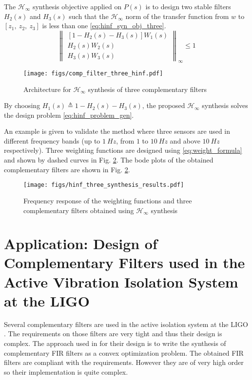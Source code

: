 \documentclass[letterpaper, 10 pt, conference]{ieeeconf}
\begin{document}
The \(\mathcal{H}_\infty\) synthesis objective applied on \(P(s)\) is to design two stable filters \(H_2(s)\) and \(H_3(s)\) such that the \(\mathcal{H}_\infty\) norm of the transfer function from \(w\) to \([z_1,\ z_2, \ z_3]\) is less than one \eqref{eq:hinf_syn_obj_three}.
\begin{equation}
\label{eq:hinf_syn_obj_three}
  \left\| \begin{matrix} \left[1 - H_2(s) - H_3(s)\right] W_1(s) \\ H_2(s) W_2(s) \\ H_3(s) W_3(s) \end{matrix} \right\|_\infty \le 1
\end{equation}

\begin{figure}[htbp]
\centering
\texttt{[image: figs/comp\_filter\_three\_hinf.pdf]}
\caption{\label{fig:comp_filter_three_hinf}
Architecture for \(\mathcal{H}_\infty\) synthesis of three complementary filters}
\end{figure}

By choosing \(H_1(s) \triangleq 1 - H_2(s) - H_3(s)\), the proposed \(\mathcal{H}_\infty\) synthesis solves the design problem \eqref{eq:hinf_problem_gen}. \par
An example is given to validate the method where three sensors are used in different frequency bands (up to \(\SI{1}{Hz}\), from \(1\) to \(\SI{10}{Hz}\) and above \(\SI{10}{Hz}\) respectively).
Three weighting functions are designed using \eqref{eq:weight_formula} and shown by dashed curves in Fig. \ref{fig:hinf_three_synthesis_results}.
The bode plots of the obtained complementary filters are shown in Fig. \ref{fig:hinf_three_synthesis_results}.

\begin{figure}[htbp]
\centering
\texttt{[image: figs/hinf\_three\_synthesis\_results.pdf]}
\caption{\label{fig:hinf_three_synthesis_results}
Frequency response of the weighting functions and three complementary filters obtained using \(\mathcal{H}_\infty\) synthesis}
\end{figure}

\section{Application: Design of Complementary Filters used in the Active Vibration Isolation System at the LIGO}
\label{sec:org58b0928}
\label{sec:application_ligo}
Several complementary filters are used in the active isolation system at the LIGO \cite{hua05_low_ligo,hua04_polyp_fir_compl_filter_contr_system}.
The requirements on those filters are very tight and thus their design is complex.
The approach used in \cite{hua05_low_ligo} for their design is to write the synthesis of complementary FIR filters as a convex optimization problem.
The obtained FIR filters are compliant with the requirements. However they are of very high order so their implementation is quite complex.
\end{document}
